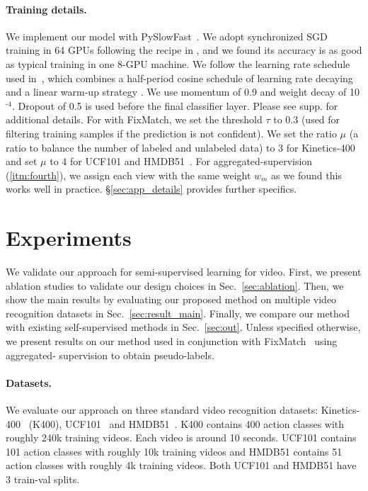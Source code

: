 \documentclass[10pt,twocolumn,letterpaper]{article}
\newcommand{\sref}[1]{\S\ref{#1}}
\begin{document}
\paragraph{Training details.}
We implement our model with \mbox{PySlowFast}~\cite{fan2020pyslowfast}.
We adopt synchronized SGD training in 64 GPUs following the recipe in \cite{Goyal2017}, and we found its accuracy is as good as typical training in one 8-GPU machine. 
We follow the learning rate schedule used in~\cite{feichtenhofer2019slowfast}, which combines 
a half-period cosine schedule \cite{Loshchilov2016} of learning rate decaying and a 
linear warm-up strategy \cite{Goyal2017}.
We use momentum of 0.9 and weight decay of 10$^\text{-4}$. Dropout \cite{srivastava2014dropout} of 0.5 is used before the final classifier layer.
Please see supp. for additional details.
For \oursshort with FixMatch, we set the threshold $\tau$ to 0.3 (used for filtering training samples if the prediction is not confident). We set the ratio $\mu$ (a ratio to balance the number of labeled and unlabeled data) to 3 for
Kinetics-400~\cite{kay2017kinetics} and set $\mu$ to 4 for
UCF101 \cite{soomro2012ucf101} and HMDB51~\cite{kuehne2011hmdb}. For aggregated-supervision (\ref{itm:fourth}), we assign each view with the same weight $w_m$ as we found this works well in practice. \sref{sec:app_details} provides further specifics. 


\section{Experiments}\label{sec:results_main}


We validate our approach for semi-supervised learning for video.
First, we present ablation studies to validate our design choices  in  Sec.~\ref{sec:ablation}.
Then, we show the main results by evaluating our proposed method on multiple video recognition datasets in 
Sec.~\ref{sec:result_main}. 
{Finally, we  compare our method with existing self-supervised methods in Sec.~\ref{sec:out}.} 
Unless specified otherwise, we present results on our method used in conjunction with FixMatch~\cite{fixmatch} {using} aggregated- supervision to obtain pseudo-labels.


\paragraph{Datasets.} 
We evaluate our approach on three {standard} video recognition datasets: Kinetics-400~\cite{kay2017kinetics} (K400), UCF101~\cite{soomro2012ucf101} and HMDB51~\cite{kuehne2011hmdb}. K400 contains 400 action classes with roughly 240k training videos. Each video is around 10 seconds. UCF101 contains 101 action classes with roughly 10k training videos and HMDB51 contains 51 action classes with roughly 4k training videos.
Both UCF101 and HMDB51 have 3 train-val splits. 
\end{document}

